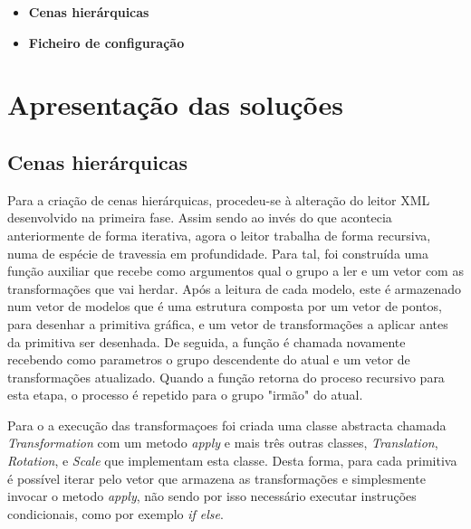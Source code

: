 \documentclass[11pt,a4paper]{report}
\begin{document}
\begin{itemize}
    \item \textbf{Cenas hierárquicas}

    \item \textbf{Ficheiro de configuração}
\end{itemize}


\chapter{Apresentação das soluções}
\section{Cenas hierárquicas}
Para a criação de cenas hierárquicas, procedeu-se à alteração do leitor XML desenvolvido na primeira fase. Assim sendo ao invés do que acontecia anteriormente de forma iterativa, agora o leitor trabalha de forma recursiva, numa de espécie de travessia em profundidade. Para tal, foi construída uma função auxiliar que recebe como argumentos qual o grupo a ler e um vetor com as transformações que vai herdar. Após a leitura de cada modelo, este é armazenado num vetor de modelos que é uma estrutura composta por um vetor de pontos, para desenhar a primitiva gráfica, e um vetor de transformações a aplicar antes da primitiva ser desenhada. De seguida, a função é chamada novamente recebendo como parametros o grupo descendente do atual e um vetor de transformações atualizado. Quando a função retorna do proceso recursivo para esta etapa, o processo é repetido para o grupo "irmão" do atual. \par
Para o a execução das transformaçoes foi criada uma classe abstracta chamada \textit{Transformation} com um metodo \textit{apply} e mais três outras classes, \textit{Translation}, \textit{Rotation},  e \textit{Scale} que implementam esta classe. Desta forma, para cada primitiva é possível iterar pelo vetor que armazena as transformações e simplesmente invocar o metodo \textit{apply}, não sendo por isso necessário executar instruções condicionais, como por exemplo \textit{if else}.  
\end{document}

